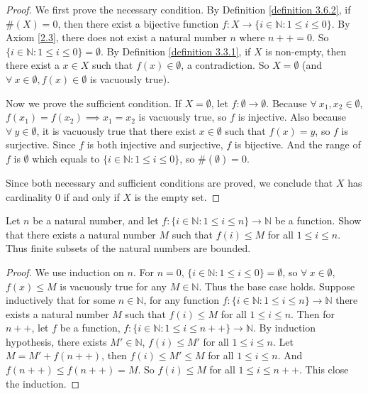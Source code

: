 \begin{proof}
We first prove the necessary condition.
By Definition \ref{definition 3.6.2}, if \(\#(X) = 0\), then there exist a bijective function \(f : X \to \{i \in \mathds{N} : 1 \leq i \leq 0\}\).
By Axiom \ref{2.3}, there does not exist a natural number \(n\) where \(n++ = 0\).
So \(\{i \in \mathds{N} : 1 \leq i \leq 0\} = \emptyset\).
By Definition \ref{definition 3.3.1}, if \(X\) is non-empty, then there exist a \(x \in X\) such that \(f(x) \in \emptyset\), a contradiction.
So \(X = \emptyset\) (and \(\forall\ x \in \emptyset, f(x) \in \emptyset\) is vacuously true).

Now we prove the sufficient condition.
If \(X = \emptyset\), let \(f : \emptyset \to \emptyset\).
Because \(\forall\ x_1, x_2 \in \emptyset\), \(f(x_1) = f(x_2) \implies x_1 = x_2\) is vacuously true, so \(f\) is injective.
Also because \(\forall\ y \in \emptyset\), it is vacuously true that there exist \(x \in \emptyset\) such that \(f(x) = y\), so \(f\) is surjective.
Since \(f\) is both injective and surjective, \(f\) is bijective.
And the range of \(f\) is \(\emptyset\) which equals to \(\{i \in \mathds{N} : 1 \leq i \leq 0\}\), so \(\#(\emptyset) = 0\).

Since both necessary and sufficient conditions are proved, we conclude that \(X\) has cardinality \(0\) if and only if \(X\) is the empty set.
\end{proof}

\begin{exercise}\label{exercise 3.6.2}
Let \(n\) be a natural number, and let \(f : \{i \in \mathds{N} : 1 \leq i \leq n\} \to \mathds{N}\) be a function.
Show that there exists a natural number \(M\) such that \(f(i) \leq M\) for all \(1 \leq i \leq n\).
Thus finite subsets of the natural numbers are bounded.
\end{exercise}

\begin{proof}
We use induction on \(n\).
For \(n = 0\), \(\{i \in \mathds{N} : 1 \leq i \leq 0\} = \emptyset\), so \(\forall\ x \in \emptyset\), \(f(x) \leq M\) is vacuously true for any \(M \in \mathds{N}\).
Thus the base case holds.
Suppose inductively that for some \(n \in \mathds{N}\), for any function \(f : \{i \in \mathds{N} : 1 \leq i \leq n\} \to \mathds{N}\) there exists a natural number \(M\) such that \(f(i) \leq M\) for all \(1 \leq i \leq n\).
Then for \(n++\), let \(f\) be a function, \(f : \{i \in \mathds{N} : 1 \leq i \leq n++\} \to \mathds{N}\).
By induction hypothesis, there exists \(M' \in \mathds{N}\), \(f(i) \leq M'\) for all \(1 \leq i \leq n\).
Let \(M = M' + f(n++)\), then \(f(i) \leq M' \leq M\) for all \(1 \leq i \leq n\).
And \(f(n++) \leq f(n++) = M\).
So \(f(i) \leq M\) for all \(1 \leq i \leq n++\).
This close the induction.
\end{proof}

